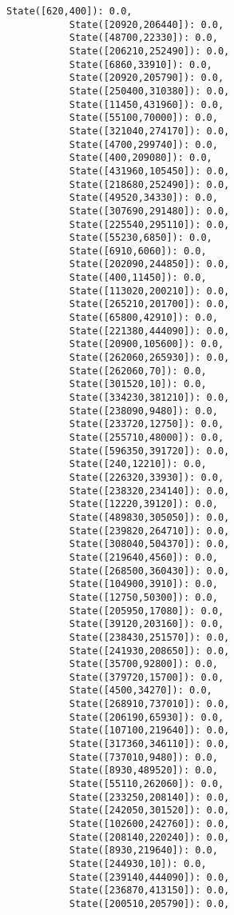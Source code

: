\documentclass[11pt]{article}
\begin{document}
\begin{Verbatim}[commandchars=\\\{\}]
           State([620,400]): 0.0,
           State([20920,206440]): 0.0,
           State([48700,22330]): 0.0,
           State([206210,252490]): 0.0,
           State([6860,33910]): 0.0,
           State([20920,205790]): 0.0,
           State([250400,310380]): 0.0,
           State([11450,431960]): 0.0,
           State([55100,70000]): 0.0,
           State([321040,274170]): 0.0,
           State([4700,299740]): 0.0,
           State([400,209080]): 0.0,
           State([431960,105450]): 0.0,
           State([218680,252490]): 0.0,
           State([49520,34330]): 0.0,
           State([307690,291480]): 0.0,
           State([225540,295110]): 0.0,
           State([55230,6850]): 0.0,
           State([6910,6060]): 0.0,
           State([202090,244850]): 0.0,
           State([400,11450]): 0.0,
           State([113020,200210]): 0.0,
           State([265210,201700]): 0.0,
           State([65800,42910]): 0.0,
           State([221380,444090]): 0.0,
           State([20900,105600]): 0.0,
           State([262060,265930]): 0.0,
           State([262060,70]): 0.0,
           State([301520,10]): 0.0,
           State([334230,381210]): 0.0,
           State([238090,9480]): 0.0,
           State([233720,12750]): 0.0,
           State([255710,48000]): 0.0,
           State([596350,391720]): 0.0,
           State([240,12210]): 0.0,
           State([226320,33930]): 0.0,
           State([238320,234140]): 0.0,
           State([12220,39120]): 0.0,
           State([489830,305050]): 0.0,
           State([239820,264710]): 0.0,
           State([308040,504370]): 0.0,
           State([219640,4560]): 0.0,
           State([268500,360430]): 0.0,
           State([104900,3910]): 0.0,
           State([12750,50300]): 0.0,
           State([205950,17080]): 0.0,
           State([39120,203160]): 0.0,
           State([238430,251570]): 0.0,
           State([241930,208650]): 0.0,
           State([35700,92800]): 0.0,
           State([379720,15700]): 0.0,
           State([4500,34270]): 0.0,
           State([268910,737010]): 0.0,
           State([206190,65930]): 0.0,
           State([107100,219640]): 0.0,
           State([317360,346110]): 0.0,
           State([737010,9480]): 0.0,
           State([8930,489520]): 0.0,
           State([55110,262060]): 0.0,
           State([233250,208140]): 0.0,
           State([242050,301520]): 0.0,
           State([102600,242760]): 0.0,
           State([208140,220240]): 0.0,
           State([8930,219640]): 0.0,
           State([244930,10]): 0.0,
           State([239140,444090]): 0.0,
           State([236870,413150]): 0.0,
           State([200510,205790]): 0.0,

\end{Verbatim}
\end{document}
